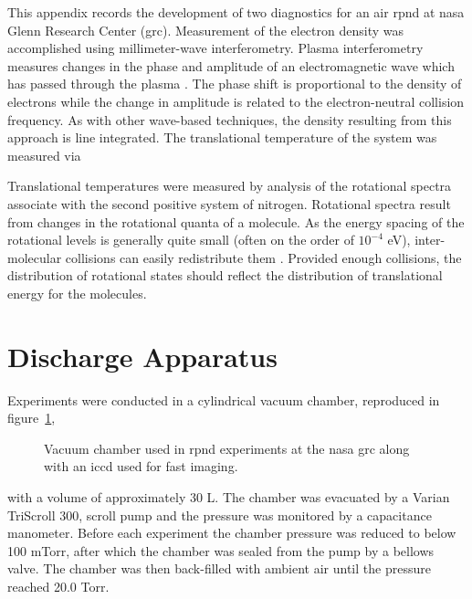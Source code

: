 This appendix records the development of two diagnostics for an air \acs{rpnd}
at \acs{nasa} Glenn Research Center (\acs{grc}). Measurement of the electron
density was accomplished using millimeter-wave interferometry. Plasma
interferometry measures changes in the phase and amplitude of an electromagnetic
wave which has passed through the plasma \cite{Lieberman2005}. The phase shift
is proportional to the density of electrons while the change in amplitude is
related to the electron-neutral collision frequency. As with other wave-based
techniques, the density resulting from this approach is line integrated. The
translational temperature of the system was measured via

Translational temperatures were measured by analysis of the rotational spectra
associate with the second positive system of nitrogen. Rotational spectra result
from changes in the rotational quanta of a molecule. As the energy spacing of
the rotational levels is generally quite small (often on the order of $10^{-4}$
eV), inter-molecular collisions can easily redistribute them
\cite{Herzberg1950}. Provided enough collisions, the distribution of rotational
states should reflect the distribution of translational energy for the
molecules.

\section{Discharge Apparatus}

Experiments were conducted in a cylindrical vacuum chamber, reproduced in
figure~\ref{fig:nasachamber},
\begin{figure}
  \centering
  \setlength\fboxsep{0pt}
  \setlength\fboxrule{1.0pt}
  \caption{Vacuum chamber used in \acs{rpnd} experiments at the \acs{nasa}
    \acs{grc} along with an \acs{iccd} used for fast imaging.}
  \label{fig:nasachamber}
\end{figure}
with a volume of approximately 30 L. The chamber was evacuated by a Varian
TriScroll 300, scroll pump and the pressure was monitored by a capacitance
manometer. Before each experiment the chamber pressure was reduced to below 100
mTorr, after which the chamber was sealed from the pump by a bellows valve. The
chamber was then back-filled with ambient air until the pressure reached 20.0
Torr.

